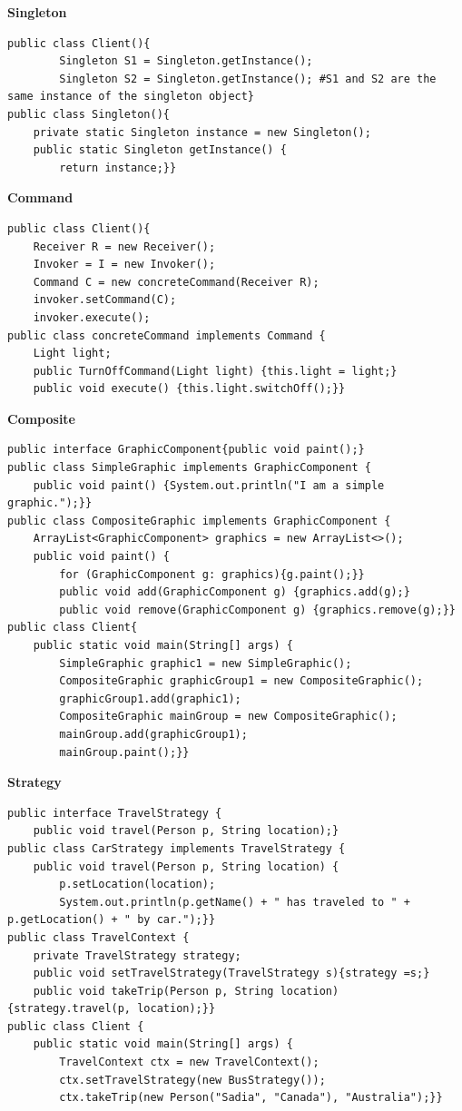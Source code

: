 \documentclass{article}
\begin{document}
\textbf{Singleton}
\begin{verbatim}
public class Client(){
        Singleton S1 = Singleton.getInstance();
        Singleton S2 = Singleton.getInstance(); #S1 and S2 are the same instance of the singleton object}
public class Singleton(){
    private static Singleton instance = new Singleton();
    public static Singleton getInstance() {
        return instance;}}
\end{verbatim}
\textbf{Command}
\begin{verbatim}
public class Client(){
    Receiver R = new Receiver();
    Invoker = I = new Invoker();
    Command C = new concreteCommand(Receiver R);
    invoker.setCommand(C);
    invoker.execute();
public class concreteCommand implements Command {
    Light light;
    public TurnOffCommand(Light light) {this.light = light;}
    public void execute() {this.light.switchOff();}}
\end{verbatim}
\textbf{Composite}
\begin{verbatim}
public interface GraphicComponent{public void paint();}
public class SimpleGraphic implements GraphicComponent {
    public void paint() {System.out.println("I am a simple graphic.");}}
public class CompositeGraphic implements GraphicComponent {
    ArrayList<GraphicComponent> graphics = new ArrayList<>();
    public void paint() {
        for (GraphicComponent g: graphics){g.paint();}}
        public void add(GraphicComponent g) {graphics.add(g);}
        public void remove(GraphicComponent g) {graphics.remove(g);}}
public class Client{
    public static void main(String[] args) {
        SimpleGraphic graphic1 = new SimpleGraphic();
        CompositeGraphic graphicGroup1 = new CompositeGraphic();
        graphicGroup1.add(graphic1);
        CompositeGraphic mainGroup = new CompositeGraphic();
        mainGroup.add(graphicGroup1);
        mainGroup.paint();}}
\end{verbatim}
\textbf{Strategy}
\begin{verbatim}
public interface TravelStrategy {
    public void travel(Person p, String location);}
public class CarStrategy implements TravelStrategy {
    public void travel(Person p, String location) {
        p.setLocation(location);
        System.out.println(p.getName() + " has traveled to " + p.getLocation() + " by car.");}}
public class TravelContext {
    private TravelStrategy strategy;
    public void setTravelStrategy(TravelStrategy s){strategy =s;}
    public void takeTrip(Person p, String location) {strategy.travel(p, location);}}
public class Client {
    public static void main(String[] args) {
        TravelContext ctx = new TravelContext();
        ctx.setTravelStrategy(new BusStrategy());
        ctx.takeTrip(new Person("Sadia", "Canada"), "Australia");}}
\end{verbatim}
\end{document}
